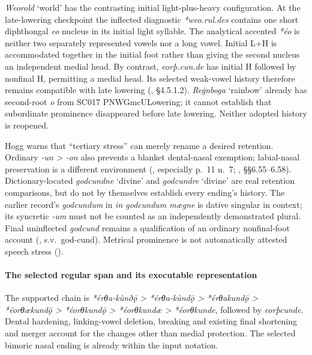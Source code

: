 \documentclass[
  british,
  a4paper,
]{article}
\begin{document}
\emph{Weorold} `world' has the contrasting initial light-plus-heavy
configuration. At the late-lowering checkpoint the inflected diagnostic
\emph{*weo.rul.des} contains one short diphthongal \emph{eo} nucleus in
its initial light syllable. The analytical accented \emph{*éo} is
neither two separately represented vowels nor a long vowel. Initial L+H
is accommodated together in the initial foot rather than giving the
second nucleus an independent medial head. By contrast,
\emph{eorþ.cun.de} has initial H followed by nonfinal H, permitting a
medial head. Its selected weak-vowel history therefore remains
compatible with late lowering (, §4.5.1.2). \emph{Reġnboga} `rainbow' already has second-root
\emph{o} from SC017 PNWGmcULowering; it cannot establish that
subordinate prominence disappeared before late lowering. Neither adopted
history is reopened.

Hogg warns that ``tertiary stress'' can merely rename a desired
retention. Ordinary \emph{-un \textgreater{} -on} also prevents a
blanket dental-nasal exemption; labial-nasal preservation is a different
environment (, especially p.~11
n.~7; , §§6.55--6.58).
Dictionary-located \emph{godcundne} `divine' and \emph{godcundre}
`divine' are real retention comparisons, but do not by themselves
establish every ending's history. The earlier record's \emph{godcundum}
in \emph{in godcundum mægne} is dative singular in context; its
syncretic \emph{-um} must not be counted as an independently
demonstrated plural. Final uninflected \emph{godcund} remains a
qualification of an ordinary nonfinal-foot account
(, s.v.~god-cund). Metrical
prominence is not automatically attested speech stress
().

\paragraph{The selected regular span and its executable
representation}\label{the-selected-regular-span-and-its-executable-representation}

The supported chain is \emph{*érθa-kùnðǭ > *érθa-kùndǭ > *érθakundǭ >
*éorθækundǭ > *éorθkundǭ > *éorθkundæ > *éorθkunde}, followed by
\emph{eorþcunde}. Dental hardening, linking-vowel deletion, breaking and
existing final shortening and merger account for the changes other than
medial protection. The selected bimoric nasal ending is already within
the input notation.
\end{document}
